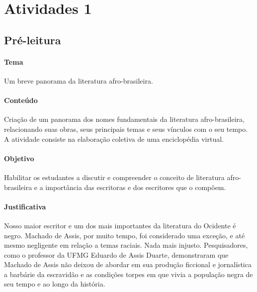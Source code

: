 \documentclass[12pt]{extarticle}
\begin{document}
\tableofcontents

\section{Atividades 1}

\subsection{Pré-leitura}

\paragraph{Tema} Um breve panorama da literatura afro-brasileira.


\paragraph{Conteúdo} Criação de um panorama dos nomes fundamentais da
literatura afro-brasileira, relacionando suas obras, seus principais
temas e seus vínculos com o seu tempo. A atividade consiste na
elaboração coletiva de uma enciclopédia virtual.

\paragraph{Objetivo} Habilitar os estudantes a discutir e compreender o
conceito de literatura afro-brasileira e a importância das escritoras e
dos escritores que o compõem.




\paragraph{Justificativa} Nosso maior escritor e um dos mais importantes
da literatura do Ocidente é negro. Machado de Assis, por muito tempo,
foi considerado uma exceção, e até mesmo negligente em relação a temas
raciais. Nada mais injusto. Pesquisadores, como o professor da UFMG
Eduardo de Assis Duarte, demonstraram que Machado de Assis não deixou de
abordar em sua produção ficcional e jornalística a barbárie da
escravidão e as condições torpes em que vivia a população negra de seu
tempo e ao longo da história.
\end{document}
